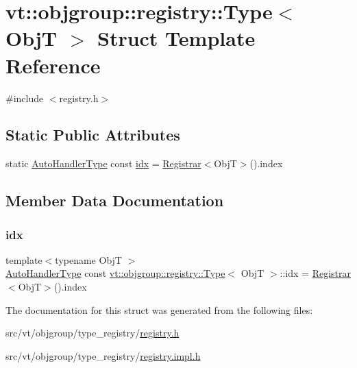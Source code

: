 \hypertarget{structvt_1_1objgroup_1_1registry_1_1_type}{}\section{vt\+:\+:objgroup\+:\+:registry\+:\+:Type$<$ ObjT $>$ Struct Template Reference}
\label{structvt_1_1objgroup_1_1registry_1_1_type}


{\ttfamily \#include $<$registry.\+h$>$}

\subsection*{Static Public Attributes}
\begin{DoxyCompactItemize}
\item 
static \hyperlink{namespacevt_1_1objgroup_1_1registry_ab61bb18a54c83c090d49a1a7f6f30037}{Auto\+Handler\+Type} const \hyperlink{structvt_1_1objgroup_1_1registry_1_1_type_a3565a13a22517b55b791f91fe141ef03}{idx} = \hyperlink{structvt_1_1objgroup_1_1registry_1_1_registrar}{Registrar}$<$ObjT$>$().index
\end{DoxyCompactItemize}


\subsection{Member Data Documentation}
\mbox{\label{structvt_1_1objgroup_1_1registry_1_1_type_a3565a13a22517b55b791f91fe141ef03}} 
\subsubsection{\texorpdfstring{idx}{idx}}
{\footnotesize\ttfamily template$<$typename ObjT $>$ \\
\hyperlink{namespacevt_1_1objgroup_1_1registry_ab61bb18a54c83c090d49a1a7f6f30037}{Auto\+Handler\+Type} const \hyperlink{structvt_1_1objgroup_1_1registry_1_1_type}{vt\+::objgroup\+::registry\+::\+Type}$<$ ObjT $>$\+::idx = \hyperlink{structvt_1_1objgroup_1_1registry_1_1_registrar}{Registrar}$<$ObjT$>$().index\hspace{0.3cm}{\ttfamily [static]}}



The documentation for this struct was generated from the following files\+:\begin{DoxyCompactItemize}
\item 
src/vt/objgroup/type\+\_\+registry/\hyperlink{objgroup_2type__registry_2registry_8h}{registry.\+h}\item 
src/vt/objgroup/type\+\_\+registry/\hyperlink{objgroup_2type__registry_2registry_8impl_8h}{registry.\+impl.\+h}\end{DoxyCompactItemize}
